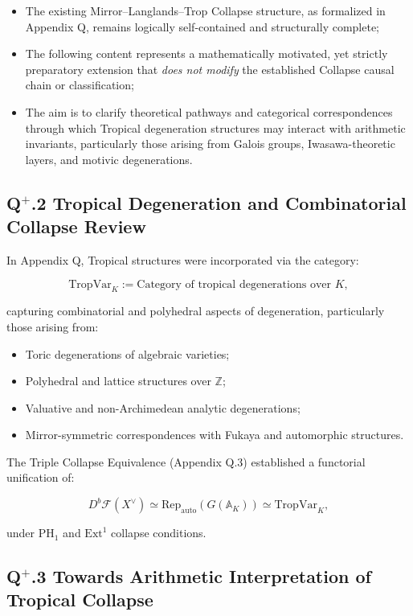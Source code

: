 \documentclass[11pt]{article}
\begin{document}
\begin{itemize}
    \item The existing Mirror--Langlands--Trop Collapse structure, as formalized in Appendix Q, remains logically self-contained and structurally complete;
    \item The following content represents a mathematically motivated, yet strictly preparatory extension that \emph{does not modify} the established Collapse causal chain or classification;
    \item The aim is to clarify theoretical pathways and categorical correspondences through which Tropical degeneration structures may interact with arithmetic invariants, particularly those arising from Galois groups, Iwasawa-theoretic layers, and motivic degenerations.
\end{itemize}

\subsection*{Q$^{+}$.2 Tropical Degeneration and Combinatorial Collapse Review}

In Appendix Q, Tropical structures were incorporated via the category:

\[
\mathrm{TropVar}_K := \text{Category of tropical degenerations over } K,
\]

capturing combinatorial and polyhedral aspects of degeneration, particularly those arising from:

\begin{itemize}
    \item Toric degenerations of algebraic varieties;
    \item Polyhedral and lattice structures over $\mathbb{Z}$;
    \item Valuative and non-Archimedean analytic degenerations;
    \item Mirror-symmetric correspondences with Fukaya and automorphic structures.
\end{itemize}

The Triple Collapse Equivalence (Appendix Q.3) established a functorial unification of:

\[
D^b\mathcal{F}(X^\vee) \simeq \mathrm{Rep}_{\mathrm{auto}}(G(\mathbb{A}_K)) \simeq \mathrm{TropVar}_K,
\]

under $\mathrm{PH}_1$ and $\mathrm{Ext}^1$ collapse conditions.

\subsection*{Q$^{+}$.3 Towards Arithmetic Interpretation of Tropical Collapse}
\end{document}
